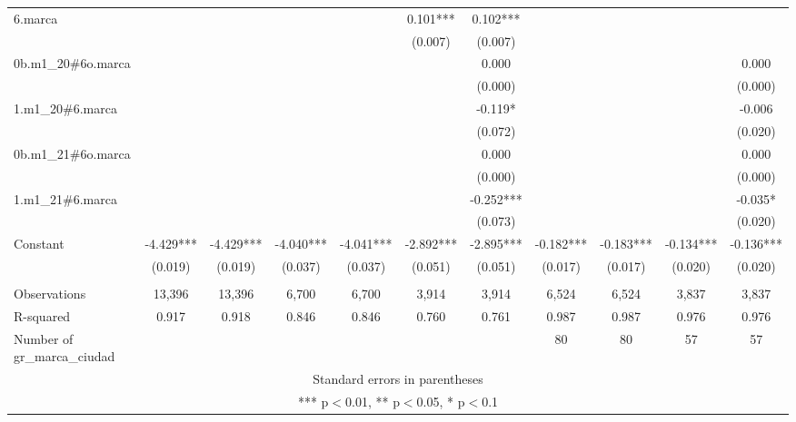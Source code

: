 \begin{tabular}{lcccccccccc}
6.marca &  &  &  &  & 0.101*** & 0.102*** &  &  &  &  \\
 &  &  &  &  & (0.007) & (0.007) &  &  &  &  \\
0b.m1\_20\#6o.marca &  &  &  &  &  & 0.000 &  &  &  & 0.000 \\
 &  &  &  &  &  & (0.000) &  &  &  & (0.000) \\
1.m1\_20\#6.marca &  &  &  &  &  & -0.119* &  &  &  & -0.006 \\
 &  &  &  &  &  & (0.072) &  &  &  & (0.020) \\
0b.m1\_21\#6o.marca &  &  &  &  &  & 0.000 &  &  &  & 0.000 \\
 &  &  &  &  &  & (0.000) &  &  &  & (0.000) \\
1.m1\_21\#6.marca &  &  &  &  &  & -0.252*** &  &  &  & -0.035* \\
 &  &  &  &  &  & (0.073) &  &  &  & (0.020) \\
Constant & -4.429*** & -4.429*** & -4.040*** & -4.041*** & -2.892*** & -2.895*** & -0.182*** & -0.183*** & -0.134*** & -0.136*** \\
 & (0.019) & (0.019) & (0.037) & (0.037) & (0.051) & (0.051) & (0.017) & (0.017) & (0.020) & (0.020) \\
 &  &  &  &  &  &  &  &  &  &  \\
Observations & 13,396 & 13,396 & 6,700 & 6,700 & 3,914 & 3,914 & 6,524 & 6,524 & 3,837 & 3,837 \\
R-squared & 0.917 & 0.918 & 0.846 & 0.846 & 0.760 & 0.761 & 0.987 & 0.987 & 0.976 & 0.976 \\
 Number of gr\_marca\_ciudad &  &  &  &  &  &  & 80 & 80 & 57 & 57 \\ \hline
\multicolumn{11}{c}{ Standard errors in parentheses} \\
\multicolumn{11}{c}{ *** p$<$0.01, ** p$<$0.05, * p$<$0.1} \\
\end{tabular}
